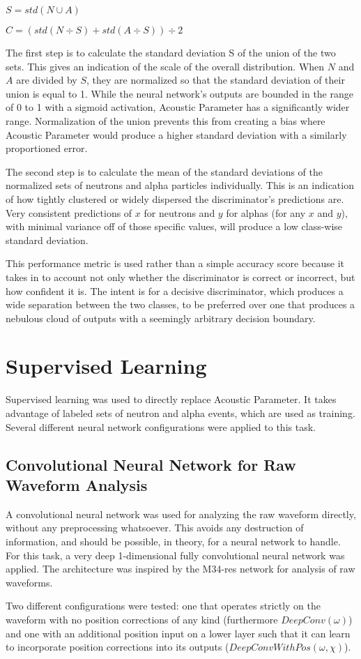 \documentclass[10pt]{article}
\begin{document}
$S=std(N \cup A)$

$C=(std(N \div S) + std(A \div S)) \div 2$

The first step is to calculate the standard deviation S of the union of the two sets. This gives an indication of the scale of the overall distribution. When $N$ and $A$ are divided by $S$, they are normalized so that the standard deviation of their union is equal to 1. While the neural network’s outputs are bounded in the range of 0 to 1 with a sigmoid activation, Acoustic Parameter has a significantly wider range. Normalization of the union prevents this from creating a bias where Acoustic Parameter would produce a higher standard deviation with a similarly proportioned error.

The second step is to calculate the mean of the standard deviations of the normalized sets of neutrons and alpha particles individually. This is an indication of how tightly clustered or widely dispersed the discriminator’s predictions are. Very consistent predictions of $x$ for neutrons and $y$ for alphas (for any $x$ and $y$), with minimal variance off of those specific values, will produce a low class-wise standard deviation.

This performance metric is used rather than a simple accuracy score because it takes in to account not only whether the discriminator is correct or incorrect, but how confident it is. The intent is for a decisive discriminator, which produces a wide separation between the two classes, to be preferred over one that produces a nebulous cloud of outputs with a seemingly arbitrary decision boundary.

\section{Supervised Learning}

Supervised learning was used to directly replace Acoustic Parameter. It takes advantage of labeled sets of neutron and alpha events, which are used as training. Several different neural network configurations were applied to this task.

\subsection{Convolutional Neural Network for Raw Waveform Analysis}

A convolutional neural network was used for analyzing the raw waveform directly, without any preprocessing whatsoever. This avoids any destruction of information, and should be possible, in theory, for a neural network to handle. For this task, a very deep 1-dimensional fully convolutional neural network was applied. The architecture was inspired by the M34-res network \cite{verydeepconvnets} for analysis of raw waveforms.

Two different configurations were tested: one that operates strictly on the waveform with no position corrections of any kind (furthermore $DeepConv(\omega)$) and one with an additional position input on a lower layer such that it can learn to incorporate position corrections into its outputs ($DeepConvWithPos(\omega, \chi)$).

\printbibliography
\end{document}
